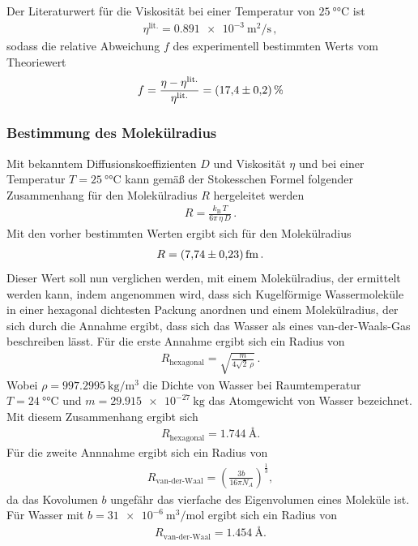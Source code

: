 Der Literaturwert\cite{litvisk} für die Viskosität bei einer Temperatur von $\SI{25}{\degree\celsius}$ ist
\begin{align*}
  \eta^\text{lit.} = \SI{0.891e-3}{\meter\squared\per\second} \, ,
\end{align*}
sodass die relative Abweichung $f$ des experimentell bestimmten Werts
vom Theoriewert
\begin{align*}
  f = \frac{\eta - \eta^\text{lit.}}{\eta^\text{lit.}} = \SI{17.4+-0.2}{\percent}
\end{align*}


\FloatBarrier
\subsubsection{Bestimmung des Molekülradius}
\label{subsubsec:molekuelradius}
Mit bekanntem Diffusionskoeffizienten $D$ und Viskosität $\eta$
und bei einer Temperatur $T=\SI{25}{\degree\celsius}$
kann gemäß
der Stokesschen Formel folgender Zusammenhang für den Molekülradius $R$ hergeleitet werden
\begin{align}
  \label{eqn:stokes}
  R = \frac{k_\text{B} \, T}{6 \pi \, \eta \, D} \, .
\end{align}
Mit den vorher bestimmten Werten ergibt sich für den Molekülradius
\begin{align*}
  R = \SI{7.74+-0.23}{\femto\meter} \, .
\end{align*}
Dieser Wert soll nun verglichen werden, mit einem Molekülradius, der ermittelt werden kann,
indem angenommen wird, dass sich
Kugelförmige Wassermoleküle in einer hexagonal dichtesten Packung anordnen
und einem Molekülradius, der sich durch die Annahme ergibt, dass sich das Wasser als eines van-der-Waals-Gas
beschreiben lässt.
Für die erste Annahme ergibt sich ein Radius von
\begin{align*}
  R_{\text{hexagonal}} = \sqrt{\frac{m}{4\sqrt{2} \, \rho}} \, .
\end{align*}
Wobei $\rho=\SI{997.2995}{\kilo\gram\per\meter\tothe{3}}$  \cite{litdicht} die Dichte von Wasser bei Raumtemperatur $T=\SI{24}{\degree\celsius}$
und $m=\SI{29.915e-27}{\kilo\gram}$ \cite{litatomgewicht} das Atomgewicht von Wasser bezeichnet.
Mit diesem Zusammenhang ergibt sich
\begin{align*}
  R_{\text{hexagonal}} = \SI{1.744}{\angstrom}.
\end{align*}
Für die zweite Annnahme ergibt sich ein Radius von
\begin{align}
R_{\text{van-der-Waal}}= \left(\frac{3b}{16\pi N_A}\right)^{\frac{1}{3}},
\end{align}
da das Kovolumen $b$ ungefähr das
vierfache des Eigenvolumen eines Moleküle ist.
Für Wasser mit $b=\SI{31e-6}{\meter\tothe{3}\per\mol}$ \cite{litwaal} ergibt sich ein Radius von
\begin{align}
R_{\text{van-der-Waal}}= \SI{1.454}{\angstrom}.
\end{align}

